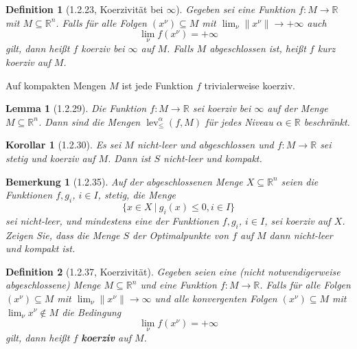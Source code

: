 \documentclass[12pt]{extreport} %
\newcommand{\R}{\mathbb{R}}
\theoremstyle{named}
\theoremstyle{nnamed}
\theoremstyle{itshape}
\newtheorem*{definition}{Definition}
\theoremstyle{normal}
\newtheorem*{bemerkung}{Bemerkung}
\newtheorem*{korollar}{Korollar}
\newtheorem*{lemma}{Lemma}
\begin{document}
\begin{definition}[1.2.23, Koerzivität bei $\infty$]
	Gegeben sei eine Funktion $f \colon M \rightarrow \R$ mit $M \subseteq \R^n$. Falls für alle Folgen $(x^\nu) \subseteq M$ mit $\lim_\nu \| x^\nu \| \rightarrow +\infty$ auch
	$$ \lim_\nu f(x^\nu) = +\infty $$
	gilt, dann heißt $f$ koerziv bei $\infty$ auf $M$. Falls $M$ abgeschlossen ist, heißt $f$ kurz koerziv auf $M$.
\end{definition}

\begin{beispiel}[1.2.28, Beispiel]
	Auf kompakten Mengen $M$ ist jede Funktion $f$ trivialerweise koerziv.
\end{beispiel}
 
\begin{lemma}[1.2.29]
	Die Funktion $f \colon M \rightarrow \R$ sei koerziv bei $\infty$ auf der Menge $M \subseteq \R^n$. Dann sind die Mengen $\operatorname{lev}_{\leq}^{\alpha}(f, M)$ für jedes Niveau $\alpha \in \R$ beschränkt.	
\end{lemma}

\begin{korollar}[1.2.30]
	Es sei $M$ nicht-leer und abgeschlossen und $f \colon M \rightarrow \R$ sei stetig und koerziv auf $M$. Dann ist $S$ nicht-leer und kompakt.
\end{korollar}

\begin{bemerkung}[1.2.35]
	Auf der abgeschlossenen Menge $X \subseteq \R^n$ seien die Funktionen $f, g_i$, $i \in I$, stetig, die Menge 
	$$ \big\{ x \in X ~|~g_i(x) \leq0, i \in I \big\} $$
	 sei nicht-leer, und mindestens eine der Funktionen $f, g_i$, $i \in I$, sei koerziv auf $X$. Zeigen Sie, dass die Menge $S$ der Optimalpunkte von $f$ auf $M$ dann nicht-leer und kompakt ist.
\end{bemerkung}


\begin{definition}[1.2.37, Koerzivität]
	Gegeben seien eine (nicht notwendigerweise abgeschlossene) Menge $M \subseteq \R^n$ und eine Funktion $f \colon M \rightarrow \R$. Falls für alle Folgen $(x^\nu) \subseteq M$ mit $\lim_\nu \| x^\nu \| \rightarrow \infty$ und alle konvergenten Folgen $(x^\nu) \subseteq M$ mit $\lim_\nu x^\nu \notin M$ die Bedingung 
	$$ \lim_\nu f(x^\nu) = +\infty $$
	gilt, dann heißt $f$ \textbf{koerziv} auf $M$.
\end{definition}
\end{document}
